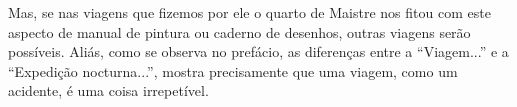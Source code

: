 \documentclass[12pt]{article}
\begin{document}
Mas, se nas viagens que fizemos por ele o quarto de Maistre nos fitou com este aspecto de manual de pintura ou caderno de desenhos, outras viagens serão possíveis. Aliás, como se observa no prefácio, as diferenças entre a ``Viagem...'' e a ``Expedição nocturna...'', mostra precisamente que uma viagem, como um acidente, é uma coisa irrepetível. 

\printbibliography[heading=bibliography,title={Bibliografia}]
\end{document}
